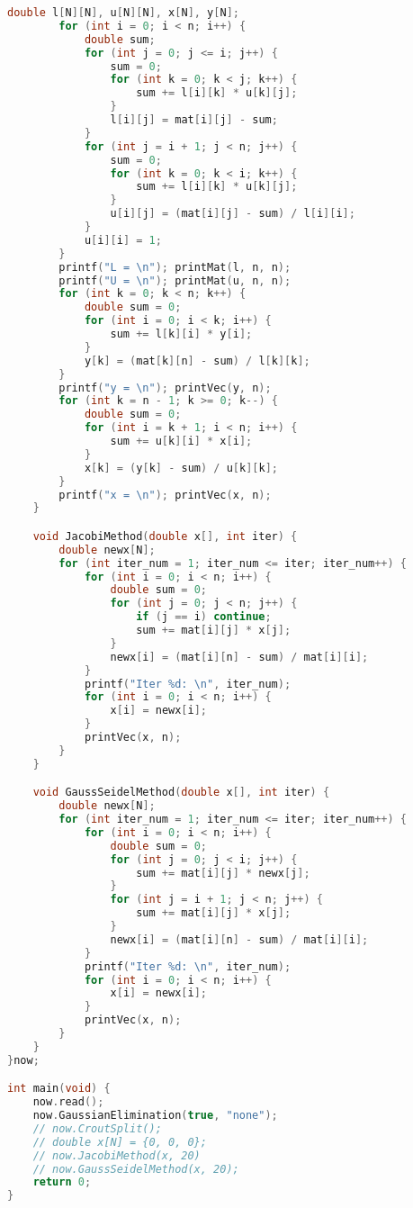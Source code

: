 \documentclass{article}
\begin{document}
\begin{lstlisting}[language=c++, escapeinside=``]
		double l[N][N], u[N][N], x[N], y[N];
		for (int i = 0; i < n; i++) {
			double sum;
			for (int j = 0; j <= i; j++) {
				sum = 0;
				for (int k = 0; k < j; k++) {
					sum += l[i][k] * u[k][j];
				}
				l[i][j] = mat[i][j] - sum;
			}
			for (int j = i + 1; j < n; j++) {
				sum = 0;
				for (int k = 0; k < i; k++) {
					sum += l[i][k] * u[k][j];
				}
				u[i][j] = (mat[i][j] - sum) / l[i][i];
			}
			u[i][i] = 1;
		}
		printf("L = \n"); printMat(l, n, n);
		printf("U = \n"); printMat(u, n, n);
		for (int k = 0; k < n; k++) {
			double sum = 0;
			for (int i = 0; i < k; i++) {
				sum += l[k][i] * y[i];
			}
			y[k] = (mat[k][n] - sum) / l[k][k];
		}
		printf("y = \n"); printVec(y, n);
		for (int k = n - 1; k >= 0; k--) {
			double sum = 0;
			for (int i = k + 1; i < n; i++) {
				sum += u[k][i] * x[i];
			}
			x[k] = (y[k] - sum) / u[k][k];
		}
		printf("x = \n"); printVec(x, n);
	}

	void JacobiMethod(double x[], int iter) {
		double newx[N];
		for (int iter_num = 1; iter_num <= iter; iter_num++) {
			for (int i = 0; i < n; i++) {
				double sum = 0;
				for (int j = 0; j < n; j++) {
					if (j == i) continue;
					sum += mat[i][j] * x[j];
				}
				newx[i] = (mat[i][n] - sum) / mat[i][i];
			}
			printf("Iter %d: \n", iter_num);
			for (int i = 0; i < n; i++) {
				x[i] = newx[i];
			}
			printVec(x, n);
		}
	}

	void GaussSeidelMethod(double x[], int iter) {
		double newx[N];
		for (int iter_num = 1; iter_num <= iter; iter_num++) {
			for (int i = 0; i < n; i++) {
				double sum = 0;
				for (int j = 0; j < i; j++) {
					sum += mat[i][j] * newx[j];
				}
				for (int j = i + 1; j < n; j++) {
					sum += mat[i][j] * x[j];
				}
				newx[i] = (mat[i][n] - sum) / mat[i][i];
			}
			printf("Iter %d: \n", iter_num);
			for (int i = 0; i < n; i++) {
				x[i] = newx[i];
			}
			printVec(x, n);
		}
	}
}now;

int main(void) {
	now.read();
	now.GaussianElimination(true, "none");
	// now.CroutSplit();
	// double x[N] = {0, 0, 0};
	// now.JacobiMethod(x, 20)
	// now.GaussSeidelMethod(x, 20);
	return 0;
}
\end{lstlisting}
\end{document}
